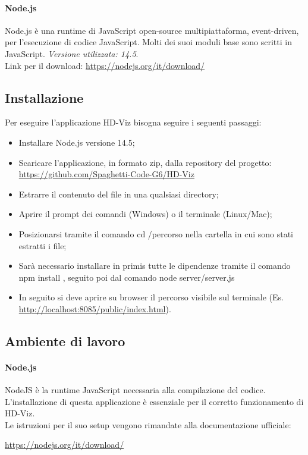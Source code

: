\documentclass[../manuale_sviluppatore.tex]{subfiles}
\begin{document}
\paragraph{Node.js}
    \label{par:node}
Node.js è una runtime di JavaScript open-source multipiattaforma, event-driven, per l’esecuzione di codice JavaScript. Molti dei suoi moduli base sono scritti in JavaScript. 
\emph{Versione utilizzata: 14.5}.\\
Link per il download: \url{https://nodejs.org/it/download/}

\subsection{Installazione}
    \label{sub:inst}

Per eseguire l’applicazione HD-Viz bisogna seguire i seguenti passaggi:
\begin{itemize}
\item Installare Node.js versione 14.5;
\item Scaricare l’applicazione, in formato zip, dalla repository del progetto: \url{https://github.com/Spaghetti-Code-G6/HD-Viz}
\item Estrarre il contenuto del file in una qualsiasi directory; 
\item Aprire il prompt dei comandi (Windows) o il terminale (Linux/Mac); 
\item Posizionarsi tramite il comando cd /percorso nella cartella in cui sono stati estratti i file;
\item Sarà necessario installare in primis tutte le dipendenze tramite il comando npm install , seguito poi dal comando node server/server.js
\item In seguito si deve aprire su browser il percorso visibile sul terminale (Es. \url{http://localhost:8085/public/index.html}).
\end{itemize}


\subsection{Ambiente di lavoro}

\paragraph{Node.js}
NodeJS è la runtime JavaScript necessaria alla compilazione del codice. L'installazione di questa applicazione è essenziale per il corretto funzionamento di HD-Viz.\\
Le istruzioni per il suo setup vengono rimandate alla documentazione ufficiale:
\begin{center}
\url{https://nodejs.org/it/download/}
\end{center}
\end{document}
